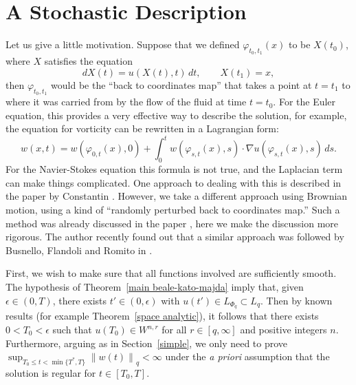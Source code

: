 \documentclass[12pt]{amsart}
\theoremstyle{remark}
\newcommand{\snormo}[1]{{\mathopen\|#1\mathclose\|}}
\begin{document}
\section{A Stochastic Description}

Let us give a little motivation.  Suppose that 
we defined $\varphi_{t_0,t_1}(x)$
to be $X(t_0)$, where $X$ satisfies
the equation
$$ dX(t) = u(X(t),t) \, dt,
   \qquad
   X(t_1) = x ,$$
then $\varphi_{t_0,t_1}$ would be the ``back to coordinates map'' that
takes a point at $t=t_1$ to where it was carried from by the flow of the
fluid at time $t=t_0$.  For the Euler equation, this provides a very effective
way to describe the solution, for example, the
equation for vorticity can be rewritten in a Lagrangian form:
$$ w(x,t) = w(\varphi_{0,t}(x),0)
   + \int_0^t w(\varphi_{s,t}(x),s) \cdot \nabla u(\varphi_{s,t}(x),s) \, ds .$$
For the Navier-Stokes equation this formula is not true, and the Laplacian term
can make things complicated.  One approach to dealing with this is described
in the paper by Constantin \cite{constantin}.  
However, we take a different approach using Brownian motion, using a
kind of
``randomly perturbed back to coordinates map.''
Such a method was already discussed in the paper
\cite{montgomery-smith-pokorny}, here we make the discussion more rigorous.
The author recently found out that a similar approach was followed by
Busnello, Flandoli and Romito in \cite{busnello et al}.

First, we wish to make sure that all functions involved are sufficiently
smooth.
The hypothesis of Theorem~\ref{main beale-kato-majda} imply that, 
given $\epsilon \in (0,T)$, there exists
$t' \in (0,\epsilon)$ with $u(t') \in L_{\Phi_q} \subset L_q$.
Then by known results (for example Theorem~\ref{space analytic}), 
it follows
that there exists $0 < T_0<\epsilon$ such that 
$u(T_0) \in W^{n,r}$ for all $r \in [q,\infty]$ and positive integers $n$.
Furthermore, arguing as in Section~\ref{simple}, we only need to prove 
$\sup_{T_0 \le t < \min\{T^*,T\}} \snormo{w(t)}_q < \infty$
under the \emph{a priori} assumption that
the solution is regular for $t \in [T_0,T]$.
\end{document}
